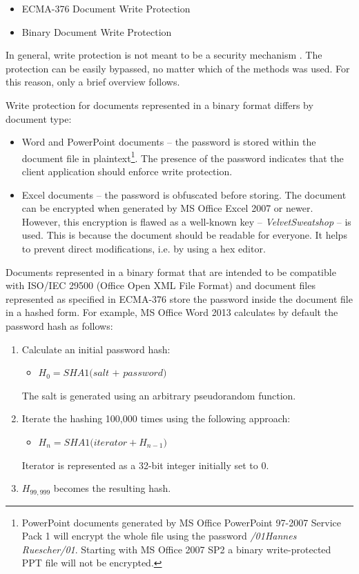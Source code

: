 \documentclass[11pt,oneside]{fithesis2}
\begin{document}
\begin{itemize}
\setlength\itemsep{0.1em}
	\item{ECMA-376 Document Write Protection}
	\item{Binary Document Write Protection}
\end{itemize}

In general, write protection is not meant to be a security mechanism \cite[p. 94]{msoffcrypto}. The protection can be easily bypassed, no matter which of the methods was used. For this reason, only a brief overview follows.

Write protection for documents represented in a binary format differs by document type:

\begin{itemize}
\setlength\itemsep{0.1em}
	\item{Word and PowerPoint documents -- the password is stored within the document file in plaintext\footnote{PowerPoint documents generated by MS Office PowerPoint 97-2007 Service Pack 1 will encrypt the whole file using the password \textit{/01Hannes Ruescher/01}. Starting with MS Office 2007 SP2 a binary write-protected PPT file will not be encrypted.}. The presence of the password indicates that the client application should enforce write protection.}
	\item{Excel documents -- the password is obfuscated before storing. The document can be encrypted when generated by MS Office Excel 2007 or newer. However, this encryption is flawed as a well-known key -- \textit{VelvetSweatshop} -- is used. This is because the document should be readable for everyone. It helps to prevent direct modifications, i.e. by using a hex editor.}
\end{itemize}

Documents represented in a binary format that are intended to be compatible with ISO/IEC 29500 (Office Open XML File Format) and document files represented as specified in ECMA-376 store the password inside the document file in a hashed form. For example, MS Office Word 2013 calculates by default the password hash as follows:

\begin{enumerate}
\item{Calculate an initial password hash:}
	\begin{itemize}
		\item{$H_0 =\textit{SHA1(salt + password)}$}
	\end{itemize}
	The salt is generated using an arbitrary pseudorandom function.
\item{Iterate the hashing 100,000 times using the following approach:}
	\begin{itemize}
		\item{$H_n = \textit{SHA1(iterator}+ H_{n-1})$}
	\end{itemize}
	Iterator is represented as a 32-bit integer initially set to 0.
\item{$H_{99,999}$ becomes the resulting hash.}
\end{enumerate}
\end{document}
